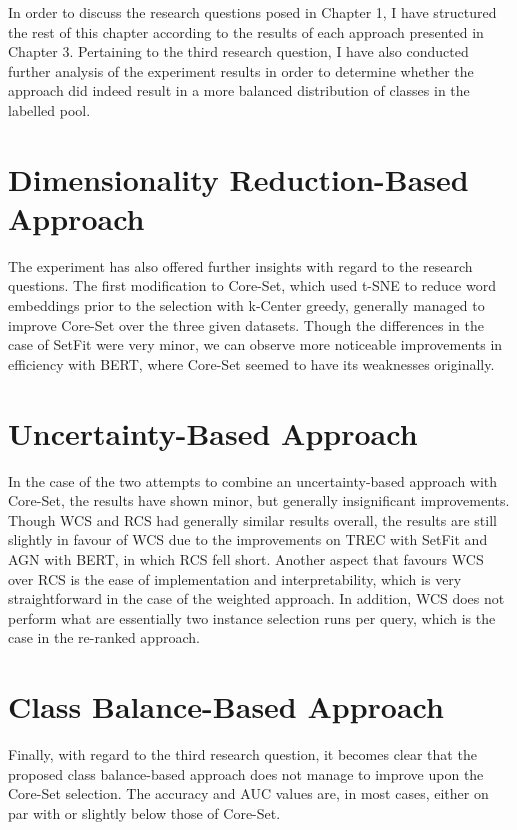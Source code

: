 \documentclass[english,bachelor,ul]{webisthesis} %
\begin{document}
In order to discuss the research questions posed in Chapter 1, I have structured the rest of this chapter according to the results of each approach presented in Chapter 3. Pertaining to the third research question, I have also conducted further analysis of the experiment results in order to determine whether the approach did indeed result in a more balanced distribution of classes in the labelled pool.

\section{Dimensionality Reduction-Based Approach}

The experiment has also offered further insights with regard to the research questions. The first modification to Core-Set, which used t-SNE to reduce word embeddings prior to the selection with k-Center greedy, generally managed to improve Core-Set over the three given datasets. Though the differences in the case of SetFit were very minor, we can observe more noticeable improvements in efficiency with BERT, where Core-Set seemed to have its weaknesses originally.  

\section{Uncertainty-Based Approach}

In the case of the two attempts to combine an uncertainty-based approach with Core-Set, the results have shown minor, but generally insignificant improvements. Though WCS and RCS had generally similar results overall, the results are still slightly in favour of WCS due to the improvements on TREC with SetFit and AGN with BERT, in which RCS fell short. Another aspect that favours WCS over RCS is the ease of implementation and interpretability, which is very straightforward in the case of the weighted approach. In addition, WCS does not perform what are essentially two instance selection runs per query, which is the case in the re-ranked approach.

\section{Class Balance-Based Approach}

Finally, with regard to the third research question, it becomes clear that the proposed class balance-based approach does not manage to improve upon the Core-Set selection. The accuracy and AUC values are, in most cases, either on par with or slightly below those of Core-Set.
\end{document}
